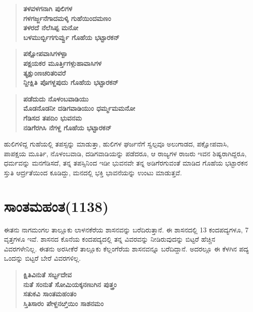 \begin{verse}
\textbf{ತಳವಳಗನಾಗಿ ಪುಲಿಗಳ} \\\textbf{ಗಳಗರ್ಜ್ಜನೆಗಾದಮಳ್ಕಿ ಗುಹೆಯಿಂದಮಣಂ} \\\textbf{ತಳರದೆ ನೆಲೆಸಿಪ್ಪ ಮನೋ} \\\textbf{ಬಳಮುರ್ಬ್ಬಿಗಗುರ್ವ್ವು ಗೊಹೆಯ ಭಟ್ಟಾರಕನ್​}
\end{verse}

\begin{verse}
\textbf{ಪಕ್ಷೋಪವಾಸಿಗಳಳ್ಪಾ} \\\textbf{ಪಕ್ಷಯಕರ ಮೂರ್ತ್ತಿಗಳ್ಗುಹಾವಾಸಿಗಳ} \\\textbf{ತ್ಯಕ್ಷುಂಣಚರಿತರಿವರೆ} \\\textbf{ನ್ದೀಕ್ಷಿತಿ ಪೊಗಳ್ದಪುದು ಗೊಹೆಯ ಭಟ್ಟಾರಕನ್​}
\end{verse}

\begin{verse}
\textbf{ಪಡೆದುದು ನೊಳಂಬವಾಡಿಯು} \\\textbf{ಮೊಡನೊಡನೀ ದಡಿಗವಾಡಿಯುಂ ಧರ್ಮ್ಮಮಮನೋ} \\\textbf{ಗೆಡಿಸದ ತಪದಿಂ ಭುವನಮ} \\\textbf{ನಡಿಗೆರಗಿಸಿ ನೆಗಳ್ದ ಗೊಹೆಯ ಭಟ್ಟಾರಕನ್​ }
\end{verse}

ಹುಲಿಗಳಿದ್ದ ಗುಹೆಯಲ್ಲಿ ತಪಸ್ಸನ್ನು ಮಾಡುತ್ತಾ, ಹುಲಿಗಳ ಘರ್ಜನೆಗೆ ಸ್ವಲ್ಪವೂ ಅಲುಗಾಡದ, ಪಕ್ಷೋಪವಾಸಿ, ಪಾಪಕ್ಷಯ ಮೂರ್ತಿ, ನೊಳಂಬವಾಡಿ, ದಡಿಗವಾಡಿಯನ್ನು ಪಡೆದರೂ, ಆ ರಾಜ್ಯಗಳ ರಾಜರು ಇವನ ಶಿಷ್ಯರಾಗಿದ್ದರೂ, ಧರ್ಮವನ್ನು ಮನಗೆಡಿಸದೆ, ತನ್ನ ತಪಸ್ಸಿನಿಂದ ಇಡೀ ಭುವನವೇ ತನ್ನ ಅಡಿಗೆರಗುವಂತೆ ಮಾಡಿದ ಗೊಹೆಯ ಭಟ್ಟಾರಕನ ಸ್ತುತಿ ಆರ್ದ್ರತೆಯಿಂದ ಕೂಡಿದ್ದು, ಮನದಲ್ಲಿ ಭಕ್ತಿ ಭಾವನೆಯನ್ನು ಉಂಟು ಮಾಡುತ್ತವೆ.


\section{ಸಾಂತಮಹಂತ(1138)}

ಈತನು ನಾಗಮಂಗಲ ತಾಲ್ಲೂಕು ಲಾಳನಕೆರೆಯ ಶಾಸನವನ್ನು ಬರೆದಿರುತ್ತಾನೆ. ಈ ಶಾಸನದಲ್ಲಿ 13 ಕಂದಪದ್ಯಗಳೂ, 7 ವೃತ್ತಗಳೂ ಇವೆ. ಶಾಸನದ ಕೊನೆಯ ಕಂದಪದ್ಯದಲ್ಲಿ ತನ್ನ ವಿವರವನ್ನು ನೀಡಿರುವುದನ್ನು ಬಿಟ್ಟರೆ ಹೆಚ್ಚಿನ ವಿವರಗಳೇನಿಲ್ಲ. ಈತನು ಅರಸೀಕೆರೆ ತಾಲ್ಲೂಕು ಕೆಲ್ಲಂಗೆರೆಯ ಶಾಸನವನ್ನೂ ಬರೆದಿದ್ದಾನೆ. ಅದರಲ್ಲೂ ಈ ಕೆಳಗಿನ ಪದ್ಯ ಒಂದನ್ನು ಬಿಟ್ಟರೆ ಬೇರೆ ವಿವರಗಳಿಲ್ಲ.

\begin{verse}
\textbf{ಕ್ಷಿತಿವಿನುತೆ ಸರ್ಬ್ಬದೇವ} \\\textbf{ನುತೆ ಸಂನುತೆ ಸೋಮಿಯಕ್ಕನಣುಗಿನ ಪುತ್ತ್ರಂ} \\\textbf{ಸತುಕವಿ ಸಾಂತಮಹಂತಂ} \\\textbf{ಸ್ತಿತಿಸಾರಂ ಪೇಳ್ದನೞ್ತಿಯಿಂ ಸಾಶನಮಂ }
\end{verse}

